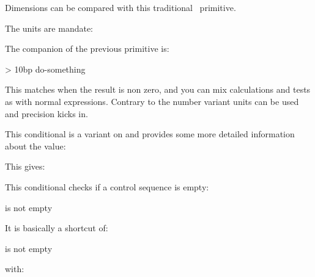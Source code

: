\startoldprimitive[title={\prm {ifdim}}]

Dimensions can be compared with this traditional \TEX\ primitive.

\startbuffer
\scratchdimen=1pt 

\ifdim\scratchdimen=\scratchcounter sp YES \else NOP\fi
\ifdim\scratchdimen=1               pt YES \else NOP\fi
\stopbuffer

\typebuffer

The units are mandate:

{\getbuffer}

\stopoldprimitive

\startnewprimitive[title={\prm {ifdimexpression}}]

The companion of the previous primitive is:

\startbuffer
\ifdimexpression 10pt > 10bp \relax
    do-something
\fi
\stopbuffer

This matches when the result is non zero, and you can mix calculations and tests
as with normal expressions. Contrary to the number variant units can be used and
precision kicks in.

\stopnewprimitive

\startnewprimitive[title={\prm {ifdimval}}]

This conditional is a variant on  and provides some more
detailed information about the value:

\stopbuffer

\typebuffer

This gives:

{\getbuffer}

\stopnewprimitive

\startnewprimitive[title={\prm {ifempty}}]

This conditional checks if a control sequence is empty:

\starttyping
is \ifempty\MyMacro \else not \fi empty
\stoptyping

It is basically a shortcut of:

\starttyping
is \ifx\MyMacro\empty \else not \fi empty
\stoptyping

with:

\starttyping
\def\empty{}
\stoptyping

